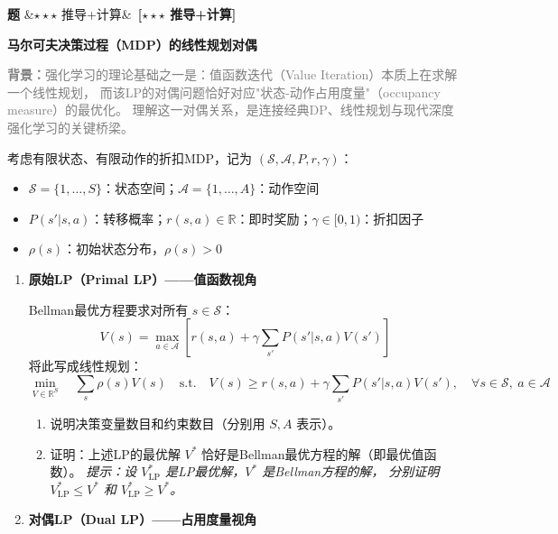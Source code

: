 \documentclass[12pt, a4paper]{article}
\newcounter{probcnt}
\newenvironment{problem}[1][]{%
  \stepcounter{probcnt}
  \begin{mdframed}[linecolor=black!30, backgroundcolor=gray!4,
    innertopmargin=8pt, innerbottommargin=8pt,
    innerleftmargin=10pt, innerrightmargin=10pt,
    skipabove=10pt, skipbelow=4pt]
  \noindent\textbf{题 \theprobcnt}\ifx&#1&\else\ \textbf{[#1]}\fi\quad
}{%
  \end{mdframed}
}
\newenvironment{subproblems}{%
  \begin{enumerate}[label=(\alph*), leftmargin=1.5em, topsep=4pt, itemsep=2pt]
}{%
  \end{enumerate}
}
\newcommand{\hint}[1]{\smallskip\noindent\textit{提示：#1}}
\newcommand{\context}[1]{\smallskip\noindent\textcolor{gray}{\small \textbf{背景：}#1}\smallskip}
\begin{document}
\begin{problem}[$\star\star\star$ 推导+计算]
\textbf{马尔可夫决策过程（MDP）的线性规划对偶}

\context{强化学习的理论基础之一是：值函数迭代（Value Iteration）本质上在求解一个线性规划，
而该LP的对偶问题恰好对应"状态-动作占用度量"（occupancy measure）的最优化。
理解这一对偶关系，是连接经典DP、线性规划与现代深度强化学习的关键桥梁。}

考虑有限状态、有限动作的折扣MDP，记为 $(\mathcal{S}, \mathcal{A}, P, r, \gamma)$：
\begin{itemize}[topsep=2pt, itemsep=1pt]
  \item $\mathcal{S} = \{1,\ldots,S\}$：状态空间；$\mathcal{A} = \{1,\ldots,A\}$：动作空间
  \item $P(s'|s,a)$：转移概率；$r(s,a) \in \mathbb{R}$：即时奖励；$\gamma \in [0,1)$：折扣因子
  \item $\rho(s)$：初始状态分布，$\rho(s) > 0$
\end{itemize}

\begin{subproblems}

  \item \textbf{原始LP（Primal LP）——值函数视角}

  Bellman最优方程要求对所有 $s \in \mathcal{S}$：
  \[
    V(s) = \max_{a \in \mathcal{A}} \left[ r(s,a) + \gamma \sum_{s'} P(s'|s,a) V(s') \right]
  \]
  将此写成线性规划：
  \[
    \min_{V \in \mathbb{R}^S} \quad \sum_s \rho(s) V(s)
    \quad \text{s.t.} \quad V(s) \geq r(s,a) + \gamma \sum_{s'} P(s'|s,a) V(s'),
    \quad \forall s \in \mathcal{S},\ a \in \mathcal{A}
  \]
  \begin{enumerate}[label=(\roman*), topsep=2pt, itemsep=1pt]
    \item 说明决策变量数目和约束数目（分别用 $S, A$ 表示）。
    \item 证明：上述LP的最优解 $V^*$ 恰好是Bellman最优方程的解（即最优值函数）。
          \hint{设 $V^*_{\text{LP}}$ 是LP最优解，$V^*$ 是Bellman方程的解，
          分别证明 $V^*_{\text{LP}} \leq V^*$ 和 $V^*_{\text{LP}} \geq V^*$。}
  \end{enumerate}

  \item \textbf{对偶LP（Dual LP）——占用度量视角}


\end{subproblems}
\end{problem}
\end{document}
